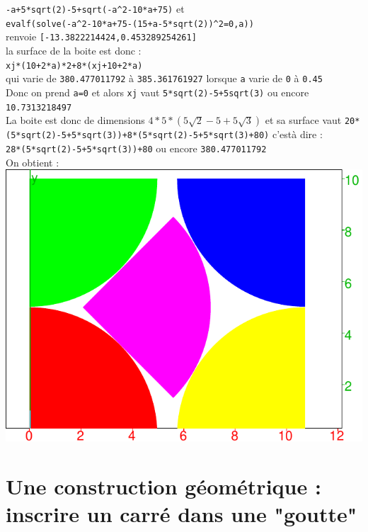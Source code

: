 \documentclass[a4paper,11pt]{book}
\begin{document}
{\tt -a+5*sqrt(2)-5+sqrt(-a\verb|^|2-10*a+75)} et\\ 
{\tt evalf(solve(-a\verb|^|2-10*a+75-(15+a-5*sqrt(2))\verb|^|2=0,a))}\\
renvoie {\tt [-13.3822214424,0.453289254261]}\\
la surface de la boite est donc :\\
{\tt  xj*(10+2*a)*2+8*(xj+10+2*a)}\\
qui varie de {\tt 380.477011792} \`a {\tt 385.361761927} lorsque {\tt a} varie 
de {\tt 0} \`a  {\tt 0.45}\\
Donc on prend {\tt a=0} et alors {\tt xj} vaut {\tt 5*sqrt(2)-5+5sqrt(3)} ou
 encore {\tt 10.7313218497}\\
La boite est donc de dimensions $4*5*(5\sqrt 2-5+5\sqrt 3)$ et sa surface vaut
{\tt 20*(5*sqrt(2)-5+5*sqrt(3))+8*(5*sqrt(2)-5+5*sqrt(3)+80)} c'est\`a dire :\\
{\tt 28*(5*sqrt(2)-5+5*sqrt(3))+80} ou encore {\tt 380.477011792}\\
On obtient :\\
\includegraphics[width=\textwidth]{biscuit5}
\section{Une construction g\'eom\'etrique : inscrire un carr\'e dans une "goutte"}
\end{document}
